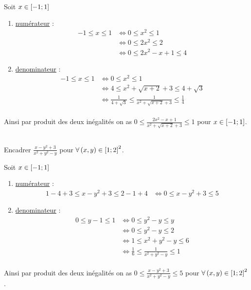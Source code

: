 \begin{corr}
	Soit \(x \in \left[-1;1\right] \)
	\begin{enumerate}
		\item \underline{numérateur} :
		      \[\begin{aligned}
				      -1 \leq x\leq 1 & \iff 0 \leq x^2 \leq 1      \\
				                      & \iff 0 \leq 2x^2 \leq 2     \\
				                      & \iff 0 \leq 2x^2-x+1 \leq 4
			      \end{aligned}
		      \]

		\item \underline{denominateur} : \[\begin{aligned}
				      -1 \leq x\leq 1 & \iff 0 \leq x^2 \leq 1                                                      \\
				                      & \iff 4 \leq x^2 +\sqrt{x+2}+3 \leq 4+\sqrt{3}                               \\
				                      & \iff \frac{1}{4+\sqrt{3}} \leq \frac{1}{x^2 +\sqrt{x+2}+3 }\leq \frac{1}{4} \\
			      \end{aligned}
		      \]
	\end{enumerate}
	Ainsi par produit des deux inégalités on as \(0\leq\frac{2x^2-x+1}{x^2+\sqrt{x+2}+3}\leq1\) pour \(x \in \left[-1;1\right]\).
\end{corr}

\begin{exoex}
    ~\\
	Encadrer \(\frac{x-y^2+3}{x^2+y^2-y}\) pour \(\forall \left(x,y\right) \in \left[1;2\right]^2\).
\end{exoex}

\begin{corr}
	Soit \(x \in \left[-1;1\right] \)
	\begin{enumerate}
		\item \underline{numérateur} :
		      \[\begin{aligned}
				      1-4+3\leq x-y^2+3 \leq 2-1+4 & \iff 0 \leq x-y^2+3 \leq 5
			      \end{aligned}
		      \]

		\item \underline{denominateur} : \[\begin{aligned}
				      0 \leq y-1\leq 1 & \iff 0 \leq y^2-y \leq y                        \\
				                       & \iff 0 \leq y^2-y \leq 2                        \\
				                       & \iff 1 \leq x^2+y^2-y\leq 6                     \\
				                       & \iff \frac{1}{6} \leq \frac{1}{x^2+y^2-y}\leq 1 \\
			      \end{aligned}
		      \]
	\end{enumerate}
	Ainsi par produit des deux inégalités on as \(0\leq \frac{x-y^2+3}{x^2+y^2-y} \leq 5\) pour \(\forall \left(x,y\right) \in \left[1;2\right]^2\).
\end{corr}

